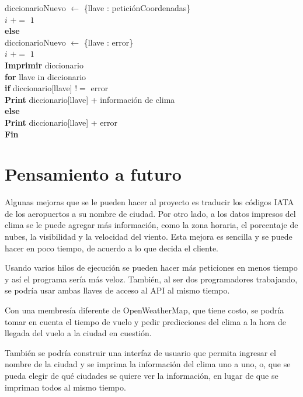 \documentclass[]{article}
\begin{document}
\indent\indent\indent\indent diccionarioNuevo $ \leftarrow $ \{llave : peticiónCoordenadas\}\\
\indent\indent\indent\indent $ i $ $ += $ $ 1 $\\
\indent\indent\indent \textbf{else}\\
\indent\indent\indent\indent diccionarioNuevo $ \leftarrow $ \{llave : error\}\\
\indent\indent\indent\indent $ i $ $ += $ $ 1 $\\
\indent\textbf{Imprimir} diccionario\\
\indent\indent \textbf{for} llave in diccionario\\
\indent\indent\indent \textbf{if} diccionario[llave] $ != $ error\\
\indent\indent\indent\indent \textbf{Print} diccionario[llave] + información de clima\\
\indent\indent\indent \textbf{else}\\
\indent\indent\indent\indent \textbf{Print} diccionario[llave] + error\\
\textbf{Fin}

\section{Pensamiento a futuro}
Algunas mejoras que se le pueden hacer al proyecto es traducir los códigos 
IATA de los aeropuertos a su nombre de ciudad. Por otro lado, a los datos 
impresos del clima se le puede agregar más información, como la zona 
horaria, el porcentaje de nubes, la visibilidad y la velocidad del viento. Esta 
mejora es sencilla y se puede hacer en poco tiempo, de acuerdo a lo que 
decida el cliente.

Usando varios hilos de ejecución se pueden hacer más peticiones en menos 
tiempo y así el programa sería más veloz. También, al ser dos 
programadores trabajando, se podría usar ambas llaves de acceso al API al 
mismo tiempo.

Con una membresía diferente de OpenWeatherMap, que tiene costo, se 
podría tomar en cuenta el tiempo de vuelo y pedir predicciones del clima a la 
hora de llegada del vuelo a la ciudad en cuestión.

También se podría construir una interfaz de usuario que permita ingresar 
el nombre de la ciudad y se imprima la información del clima uno a uno, o, 
que se pueda elegir de qué ciudades se quiere ver la información, en lugar de 
que se impriman todos al mismo tiempo.
\end{document}
